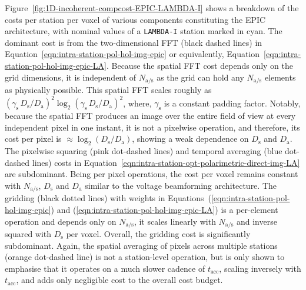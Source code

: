 \documentclass[
  journal=pasa,
  manuscript=article-type,
  year=2020,
  volume=37,
]{cup-journal}
\begin{document}
Figure~\ref{fig:1D-incoherent-compcost-EPIC-LAMBDA-I} shows a breakdown of the costs per station per voxel of various components constituting the EPIC architecture, with nominal values of a \texttt{LAMBDA-I} station marked in cyan. The dominant cost is from the two-dimensional FFT (black dashed lines) in Equation~\ref{eqn:intra-station-pol-hol-img-epic} or equivalently, Equation~\ref{eqn:intra-station-pol-hol-img-epic-LA}. Because the spatial FFT cost depends only on the grid dimensions, it is independent of $N_\textrm{a/s}$ as the grid can hold any $N_\textrm{a/s}$ elements as physically possible. This spatial FFT scales roughly as $(\gamma_\textrm{s} \, D_\textrm{s}/D_\textrm{a})^2\log_2(\gamma_\textrm{s}\, D_\textrm{s}/D_\textrm{a})^2$, where, $\gamma_\textrm{s}$ is a constant padding factor. Notably, because the spatial FFT produces an image over the entire field of view at every independent pixel in one instant, it is not a pixelwise operation, and therefore, its cost per pixel is $\approx \log_2(D_\textrm{s}/D_\textrm{a})$, showing a weak dependence on $D_\textrm{s}$ and $D_\textrm{a}$. The pixelwise squaring (pink dot-dashed lines) and temporal averaging (blue dot-dashed lines) costs in Equation~\ref{eqn:intra-station-opt-polarimetric-direct-img-LA} are subdominant. Being per pixel operations, the cost per voxel remains constant with $N_\textrm{a/s}$, $D_\textrm{s}$ and $D_\textrm{a}$ similar to the voltage beamforming architecture. The gridding (black dotted lines) with weights in Equations~(\ref{eqn:intra-station-pol-hol-img-epic}) and (\ref{eqn:intra-station-pol-hol-img-epic-LA}) is a per-element operation and depends only on $N_\textrm{a/s}$, it scales linearly with $N_\textrm{a/s}$ and inverse squared with $D_\textrm{s}$ per voxel. Overall, the gridding cost is significantly subdominant. Again, the spatial averaging of pixels across multiple stations (orange dot-dashed line) is not a station-level operation, but is only shown to emphasise that it operates on a much slower cadence of $t_\textrm{acc}$, scaling inversely with $t_\textrm{acc}$, and adds only negligible cost to the overall cost budget. 
\end{document}
